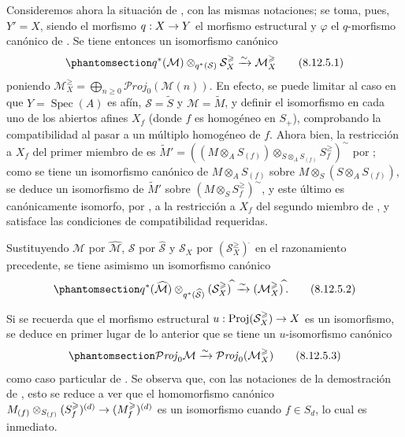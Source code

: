 \documentclass[oneside,10pt]{amsart}
\makeatletter
\renewcommand{\geq}{\geqslant}
\newcommand{\ega@arrow}[2]{\mathchoice{#1}{#2}{#2}{#2}}
\renewcommand{\to}{\ega@arrow{\longrightarrow}{\rightarrow}}
\newcommand{\oldpage}[2][]{\marginnote{\normalfont\footnotesize\textbf{#1}~|~#2}\ignorespaces}
\let\EGAOriginalLabel\label
\renewcommand{\label}[1]{\phantomsection\EGAOriginalLabel{#1}}
\makeatother
\begin{document}
\begin{env}[8.12.5]
\label{II.8.12.5-fr}
Consideremos ahora la situación de , con las mismas notaciones;
se toma, pues, $Y'=X$, siendo el morfismo $q:X\to Y$ el morfismo estructural y $\varphi$ el $q$-morfismo canónico de .
Se tiene entonces un isomorfismo canónico
\begin{equation}
\label{II.8.12.5.1-fr}
  q^*(\mathcal{M})\otimes_{q^*(\mathcal{S})}\mathcal{S}_X^{\geq}
  \xrightarrow{\sim}\mathcal{M}_X^{\geq}
\tag{8.12.5.1}
\end{equation}
poniendo $\mathcal{M}_X^{\geq}=\bigoplus_{n\geq0}\mathcal{P}\mathit{roj}_0(\mathcal{M}(n))$.
En efecto, se puede limitar al caso en que $Y=\operatorname{Spec}(A)$ es afín, $\mathcal{S}=\widetilde{S}$ y $\mathcal{M}=\widetilde{M}$, y definir el isomorfismo  en cada uno de los abiertos afines $X_f$ (donde $f$ es homogéneo en $S_+$), comprobando la compatibilidad al pasar a un múltiplo homogéneo de $f$.
Ahora bien, la restricción a $X_f$ del primer miembro de  es $\widetilde{M}'=
\left((M\otimes_A S_{(f)})
\otimes_{S\otimes_A S_{(f)}}S_f^{\geq}\right)^{\sim}$ por ;
como se tiene un isomorfismo canónico de $M\otimes_A S_{(f)}$ sobre $M\otimes_S(S\otimes_A S_{(f)})$, se deduce un isomorfismo de $\widetilde{M}'$ sobre $\left(M\otimes_S S_f^{\geq}\right)^{\sim}$, y este último es canónicamente isomorfo, por , a la restricción a $X_f$ del segundo miembro de , y satisface las condiciones de compatibilidad requeridas.
\oldpage[II]{194}

Sustituyendo $\mathcal{M}$ por $\widehat{\mathcal{M}}$, $\mathcal{S}$ por $\widehat{\mathcal{S}}$ y $\mathcal{S}_X$ por $(\mathcal{S}_X^{\geq})^{\widehat{\,}}$ en el razonamiento precedente, se tiene asimismo un isomorfismo canónico
\begin{equation}
\label{II.8.12.5.2-fr}
  q^*(\widehat{\mathcal{M}})
  \otimes_{q^*(\widehat{\mathcal{S}})}(\mathcal{S}_X^{\geq})^{\widehat{\,}}
  \xrightarrow{\sim}(\mathcal{M}_X^{\geq})^{\widehat{\,}}.
\tag{8.12.5.2}
\end{equation}

Si se recuerda  que el morfismo estructural $u:\operatorname{Proj}(\mathcal{S}_X^{\geq})\to X$ es un isomorfismo, se deduce en primer lugar de lo anterior que se tiene un $u$-isomorfismo canónico
\begin{equation}
\label{II.8.12.5.3-fr}
  \mathcal{P}\mathit{roj}_0\mathcal{M}
  \xrightarrow{\sim}\mathcal{P}\mathit{roj}_0(\mathcal{M}_X^{\geq})
\tag{8.12.5.3}
\end{equation}
como caso particular de .
Se observa que, con las notaciones de la demostración de , esto se reduce a ver que el homomorfismo canónico $M_{(f)}\otimes_{S_{(f)}}(S_f^{\geq})^{(d)}\to(M_f^{\geq})^{(d)}$ es un isomorfismo cuando $f\in S_d$, lo cual es inmediato.


\end{env}
\end{document}
